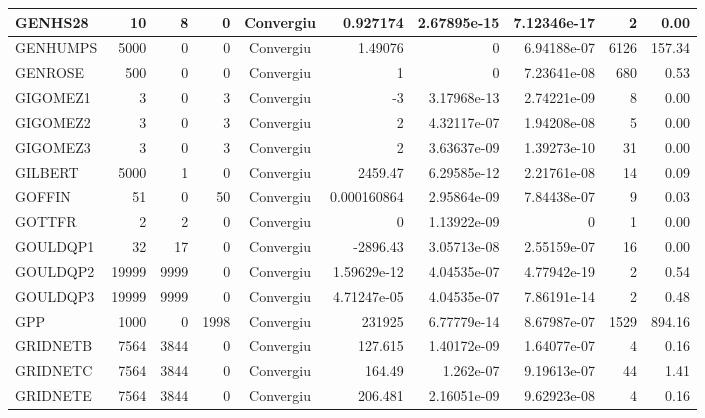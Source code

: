 \begin{center}
\begin{longtable}{|l|r|r|r|c|r|r|r|r|r|}
 GENHS28 &     10 &      8 &      0 & Convergiu  &    0.927174 &    2.67895e-15 & 7.12346e-17 &      2 &    0.00 \\ \hline
GENHUMPS &   5000 &      0 &      0 & Convergiu  &     1.49076 &              0 & 6.94188e-07 &   6126 &  157.34 \\ \hline
 GENROSE &    500 &      0 &      0 & Convergiu  &           1 &              0 & 7.23641e-08 &    680 &    0.53 \\ \hline
GIGOMEZ1 &      3 &      0 &      3 & Convergiu  &          -3 &    3.17968e-13 & 2.74221e-09 &      8 &    0.00 \\ \hline
GIGOMEZ2 &      3 &      0 &      3 & Convergiu  &           2 &    4.32117e-07 & 1.94208e-08 &      5 &    0.00 \\ \hline
GIGOMEZ3 &      3 &      0 &      3 & Convergiu  &           2 &    3.63637e-09 & 1.39273e-10 &     31 &    0.00 \\ \hline
 GILBERT &   5000 &      1 &      0 & Convergiu  &     2459.47 &    6.29585e-12 & 2.21761e-08 &     14 &    0.09 \\ \hline
  GOFFIN &     51 &      0 &     50 & Convergiu  & 0.000160864 &    2.95864e-09 & 7.84438e-07 &      9 &    0.03 \\ \hline
  GOTTFR &      2 &      2 &      0 & Convergiu  &           0 &    1.13922e-09 &           0 &      1 &    0.00 \\ \hline
GOULDQP1 &     32 &     17 &      0 & Convergiu  &    -2896.43 &    3.05713e-08 & 2.55159e-07 &     16 &    0.00 \\ \hline
GOULDQP2 &  19999 &   9999 &      0 & Convergiu  & 1.59629e-12 &    4.04535e-07 & 4.77942e-19 &      2 &    0.54 \\ \hline
GOULDQP3 &  19999 &   9999 &      0 & Convergiu  & 4.71247e-05 &    4.04535e-07 & 7.86191e-14 &      2 &    0.48 \\ \hline
     GPP &   1000 &      0 &   1998 & Convergiu  &      231925 &    6.77779e-14 & 8.67987e-07 &   1529 &  894.16 \\ \hline
GRIDNETB &   7564 &   3844 &      0 & Convergiu  &     127.615 &    1.40172e-09 & 1.64077e-07 &      4 &    0.16 \\ \hline
GRIDNETC &   7564 &   3844 &      0 & Convergiu  &      164.49 &      1.262e-07 & 9.19613e-07 &     44 &    1.41 \\ \hline
GRIDNETE &   7564 &   3844 &      0 & Convergiu  &     206.481 &    2.16051e-09 & 9.62923e-08 &      4 &    0.16 \\ \hline

\end{longtable}
\end{center}
